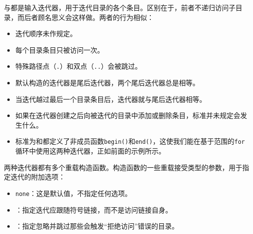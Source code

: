 
与都是输入迭代器，用于迭代目录的各个条目。区别在于，前者不递归访问子目录，而后者顾名思义会这样做。两者的行为相似：



\begin{itemize}
\item 迭代顺序未作规定。



\item 每个目录条目只被访问一次。



\item 特殊路径点（\texttt{.}）和双点（\texttt{..}）会被跳过。



\item 默认构造的迭代器是尾后迭代器，两个尾后迭代器总是相等。



\item 当迭代越过最后一个目录条目后，迭代器就与尾后迭代器相等。



\item 如果在迭代器创建之后向被迭代的目录中添加或删除条目，标准并未规定会发生什么。



\item 标准为和都定义了非成员函数\texttt{begin()}和\texttt{end()}，这使我们能在基于范围的\texttt{for}循环中使用这两种迭代器，正如前面的示例所示。

\end{itemize}



两种迭代器都有多个重载构造函数。构造函数的一些重载接受类型的参数，用于指定迭代的附加选项：



\begin{itemize}
\item \texttt{none}：这是默认值，不指定任何选项。



\item {}：指定迭代应跟随符号链接，而不是访问链接自身。



\item {}：指定忽略并跳过那些会触发“拒绝访问”错误的目录。

\end{itemize}



